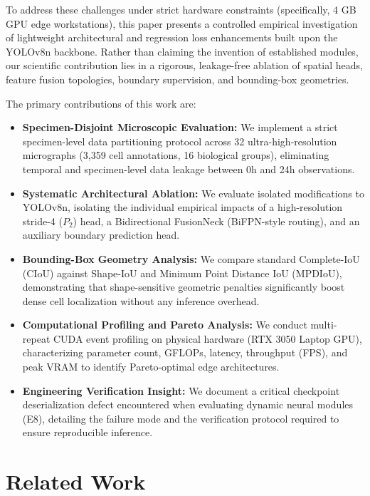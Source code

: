 \documentclass[conference]{IEEEtran}
\begin{document}
To address these challenges under strict hardware constraints (specifically, 4 GB GPU edge workstations), this paper presents a controlled empirical investigation of lightweight architectural and regression loss enhancements built upon the YOLOv8n backbone. Rather than claiming the invention of established modules, our scientific contribution lies in a rigorous, leakage-free ablation of spatial heads, feature fusion topologies, boundary supervision, and bounding-box geometries.

The primary contributions of this work are:
\begin{itemize}
    \item \textbf{Specimen-Disjoint Microscopic Evaluation:} We implement a strict specimen-level data partitioning protocol across 32 ultra-high-resolution micrographs (3,359 cell annotations, 16 biological groups), eliminating temporal and specimen-level data leakage between 0h and 24h observations.
    \item \textbf{Systematic Architectural Ablation:} We evaluate isolated modifications to YOLOv8n, isolating the individual empirical impacts of a high-resolution stride-4 ($P_2$) head, a Bidirectional FusionNeck (BiFPN-style routing), and an auxiliary boundary prediction head.
    \item \textbf{Bounding-Box Geometry Analysis:} We compare standard Complete-IoU (CIoU) against Shape-IoU and Minimum Point Distance IoU (MPDIoU), demonstrating that shape-sensitive geometric penalties significantly boost dense cell localization without any inference overhead.
    \item \textbf{Computational Profiling and Pareto Analysis:} We conduct multi-repeat CUDA event profiling on physical hardware (RTX 3050 Laptop GPU), characterizing parameter count, GFLOPs, latency, throughput (FPS), and peak VRAM to identify Pareto-optimal edge architectures.
    \item \textbf{Engineering Verification Insight:} We document a critical checkpoint deserialization defect encountered when evaluating dynamic neural modules (E8), detailing the failure mode and the verification protocol required to ensure reproducible inference.
\end{itemize}

\section{Related Work}
\end{document}
